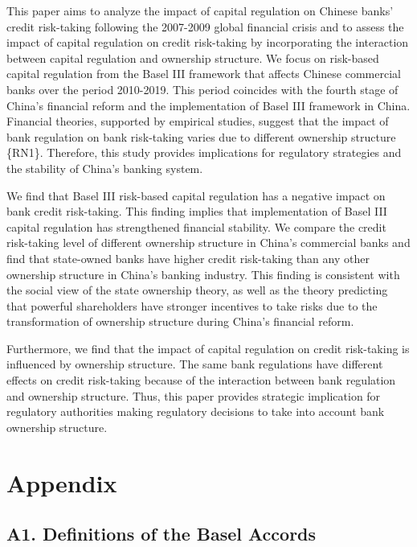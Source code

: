 \documentclass{article}
\begin{document}
This paper aims to analyze the impact of capital regulation on Chinese
banks' credit risk-taking following the 2007-2009 global financial
crisis and to assess the impact of capital regulation on credit
risk-taking by incorporating the interaction between capital regulation
and ownership structure. We focus on risk-based capital regulation from
the Basel III framework that affects Chinese commercial banks over the
period 2010-2019. This period coincides with the fourth stage of China's
financial reform and the implementation of Basel III framework in China.
Financial theories, supported by empirical studies, suggest that the
impact of bank regulation on bank risk-taking varies due to different
ownership structure \{RN1\}. Therefore, this study provides implications
for regulatory strategies and the stability of China's banking system.

We find that Basel III risk-based capital regulation has a negative
impact on bank credit risk-taking. This finding implies that
implementation of Basel III capital regulation has strengthened
financial stability. We compare the credit risk-taking level of
different ownership structure in China's commercial banks and find that
state-owned banks have higher credit risk-taking than any other
ownership structure in China's banking industry. This finding is
consistent with the social view of the state ownership theory, as well
as the theory predicting that powerful shareholders have stronger
incentives to take risks due to the transformation of ownership
structure during China's financial reform.

Furthermore, we find that the impact of capital regulation on credit
risk-taking is influenced by ownership structure. The same bank
regulations have different effects on credit risk-taking because of the
interaction between bank regulation and ownership structure. Thus, this
paper provides strategic implication for regulatory authorities making
regulatory decisions to take into account bank ownership structure.

\hypertarget{appendix}{%
\section{Appendix}\label{appendix}}

\hypertarget{a1.-definitions-of-the-basel-accords}{%
\subsection{A1. Definitions of the Basel
Accords}\label{a1.-definitions-of-the-basel-accords}}
\end{document}
